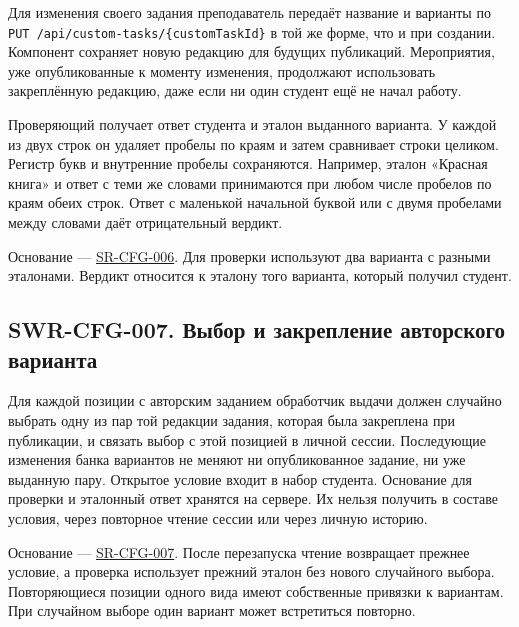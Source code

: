\documentclass[12pt,a4paper]{article}
\begin{document}
Для изменения своего задания преподаватель передаёт название и варианты по \texttt{PUT /\allowbreak{}api/\allowbreak{}custom-\allowbreak{}tasks/\allowbreak{}\{custom\allowbreak{}Task\allowbreak{}Id\}} в той же форме, что и при создании. Компонент сохраняет новую редакцию для будущих публикаций. Мероприятия, уже опубликованные к моменту изменения, продолжают использовать закреплённую редакцию, даже если ни один студент ещё не начал работу.

Проверяющий получает ответ студента и эталон выданного варианта. У каждой из двух строк он удаляет пробелы по краям и затем сравнивает строки целиком. Регистр букв и внутренние пробелы сохраняются. Например, эталон «Красная книга» и ответ с теми же словами принимаются при любом числе пробелов по краям обеих строк. Ответ с маленькой начальной буквой или с двумя пробелами между словами даёт отрицательный вердикт.

Основание --- {\href{../04\_Системные\_требования/DOC-05\_Системные\_требования.pdf\#sr-cfg-006}{SR-CFG-006}}. Для проверки используют два варианта с разными эталонами. Вердикт относится к эталону того варианта, который получил студент.

\subsection{SWR-CFG-007. Выбор и закрепление авторского варианта}\label{swr-cfg-007-ux432ux44bux431ux43eux440-ux438-ux437ux430ux43aux440ux435ux43fux43bux435ux43dux438ux435-ux430ux432ux442ux43eux440ux441ux43aux43eux433ux43e-ux432ux430ux440ux438ux430ux43dux442ux430}

\hypertarget{swr-cfg-007-выбор-и-закрепление-авторского-варианта}{}

\hypertarget{swr-cfg-007}{}

Для каждой позиции с авторским заданием обработчик выдачи должен случайно выбрать одну из пар той редакции задания, которая была закреплена при публикации, и связать выбор с этой позицией в личной сессии. Последующие изменения банка вариантов не меняют ни опубликованное задание, ни уже выданную пару. Открытое условие входит в набор студента. Основание для проверки и эталонный ответ хранятся на сервере. Их нельзя получить в составе условия, через повторное чтение сессии или через личную историю.

Основание --- {\href{../04\_Системные\_требования/DOC-05\_Системные\_требования.pdf\#sr-cfg-007}{SR-CFG-007}}. После перезапуска чтение возвращает прежнее условие, а проверка использует прежний эталон без нового случайного выбора. Повторяющиеся позиции одного вида имеют собственные привязки к вариантам. При случайном выборе один вариант может встретиться повторно.
\end{document}
